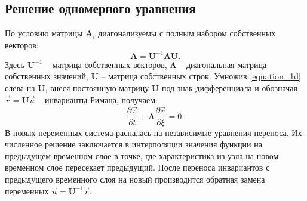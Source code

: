 \documentclass[a4paper]{article}
\numberwithin{equation}{section}
\begin{document}
\subsection{Решение одномерного уравнения}
По условию матрицы $\mathbf{A}_i$ диагонализуемы с полным набором собственных векторов:
\begin{equation}
	\label{diagonal_view}
	\mathbf{A} = \mathbf{U}^{-1}\mathbf{\Lambda}\mathbf{U}.
\end{equation}
Здесь $\mathbf{U}^{-1}$ -- матрица собственных векторов, 
$\mathbf{\Lambda}$ -- диагональная матрица собственных значений,
$\mathbf{U}$ -- матрица собственных строк.
Умножив \eqref{equation_1d} слева на $\mathbf{U}$, 
внеся постоянную матрицу $\mathbf{U}$ под знак дифференциала
и обозначая $\vec{r} = \mathbf{U}\vec{u}$ -- инварианты Римана, получаем:
\begin{equation}
	\label{in_riemann_invariants}
	\frac{\partial\vec{r}}{\partial{t}}+\mathbf{\Lambda}\frac{\partial\vec{r}}{\partial{\xi}} = 0.
\end{equation}
В новых переменных система распалась на независимые уравнения переноса.
Их численное решение заключается в интерполяции значения функции
на предыдущем временном слое в точке, где характеристика из узла 
на новом временном слое пересекает предыдущий. 
После переноса инвариантов с предыдущего временного слоя на новый
производится обратная замена переменных $\vec{u} = \mathbf{U}^{-1}\vec{r}$.
\end{document}
